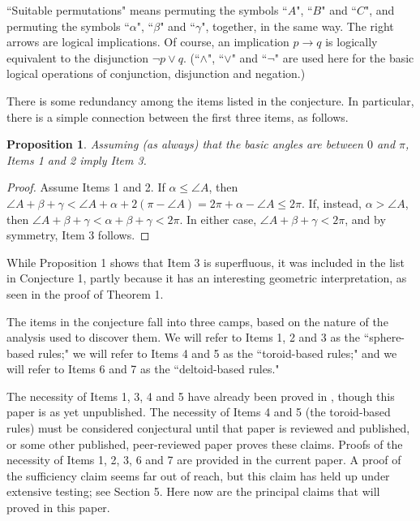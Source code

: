 \documentclass[a4paper, twoside]{article}
\newtheorem{proposition}{Proposition}
\begin{document}
\noindent ``Suitable permutations" means permuting the symbols ``$A$", ``$B$" and ``$C$", and permuting the symbols ``$\alpha$", ``$\beta$" and ``$\gamma$", together, in the same way.  The right arrows are logical implications. Of course, an implication $p \rightarrow q$ is logically equivalent to the disjunction $\neg p \vee q$. (``$\wedge$", ``$\vee$" and ``$\neg$" are used here for the basic logical operations of conjunction, disjunction and negation.) 

There is some redundancy among the items listed in the conjecture. In particular, there is a simple connection between the first three items, as follows. 

\vspace{2mm}

\begin{proposition}
Assuming (as always) that the basic angles are between $0$ and $\pi$, Items 1 and 2 imply Item 3. 
\end{proposition}

\begin{proof}
Assume Items 1 and 2. If $\alpha \le \angle A$, then $\angle A + \beta + \gamma < \angle A + \alpha + 2 (\pi - \angle A) = 2\pi + \alpha - \angle A \le 2\pi$. If, instead, $\alpha > \angle A$, then $\angle A + \beta + \gamma < \alpha + \beta + \gamma < 2\pi$. In either case, $\angle A + \beta + \gamma < 2\pi$, and by symmetry, Item 3 follows.  

\end{proof}

\noindent While Proposition 1 shows that Item 3 is superfluous, it was included in the list in Conjecture 1, partly because it has an interesting geometric interpretation, as seen in the proof of Theorem 1.

The items in the conjecture fall into three camps, based on the nature of the analysis used to discover them. We will refer to Items 1, 2 and 3 as the ``sphere-based rules;" we will refer to Items 4 and 5 as the ``toroid-based rules;" and we will refer to Items 6 and 7 as the ``deltoid-based rules." 

The necessity of Items 1, 3, 4 and 5 have already been proved in \cite{R4}, though this paper is as yet unpublished. The necessity of Items 4 and 5 (the toroid-based rules) must be considered conjectural until that paper is reviewed and published, or some other published, peer-reviewed paper proves these claims. Proofs of the necessity of Items 1, 2, 3, 6 and 7 are provided in the current paper. A proof of the sufficiency claim seems far out of reach, but this claim has held up under extensive testing; see Section 5. Here now are the principal claims that will proved in this paper.
\end{document}
